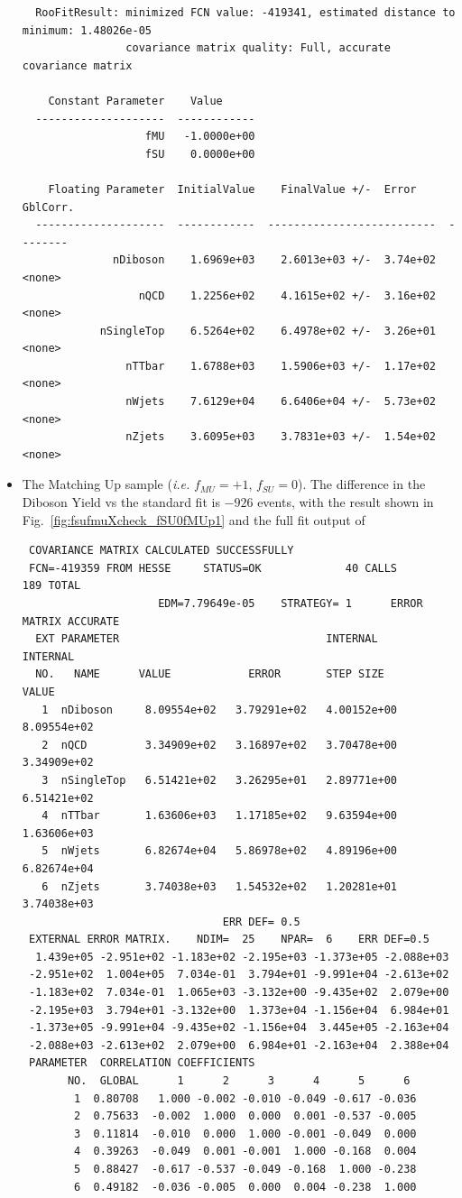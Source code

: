 \begin{itemize}
{\begin{verbatim}
  RooFitResult: minimized FCN value: -419341, estimated distance to minimum: 1.48026e-05
                covariance matrix quality: Full, accurate covariance matrix

    Constant Parameter    Value     
  --------------------  ------------
                   fMU   -1.0000e+00
                   fSU    0.0000e+00

    Floating Parameter  InitialValue    FinalValue +/-  Error     GblCorr.
  --------------------  ------------  --------------------------  --------
              nDiboson    1.6969e+03    2.6013e+03 +/-  3.74e+02  <none>
                  nQCD    1.2256e+02    4.1615e+02 +/-  3.16e+02  <none>
            nSingleTop    6.5264e+02    6.4978e+02 +/-  3.26e+01  <none>
                nTTbar    1.6788e+03    1.5906e+03 +/-  1.17e+02  <none>
                nWjets    7.6129e+04    6.6406e+04 +/-  5.73e+02  <none>
                nZjets    3.6095e+03    3.7831e+03 +/-  1.54e+02  <none>

\end{verbatim}
}


\item The Matching Up sample (\textit{i.e.} $f_{MU}=+1$, $f_{SU}=0$). The difference in the Diboson Yield vs the standard fit is $-926$ events, with the result shown in Fig.~\ref{fig:fsufmuXcheck_fSU0fMUp1} and the full fit output of
{\tiny
\begin{verbatim}
 COVARIANCE MATRIX CALCULATED SUCCESSFULLY
 FCN=-419359 FROM HESSE     STATUS=OK             40 CALLS         189 TOTAL
                     EDM=7.79649e-05    STRATEGY= 1      ERROR MATRIX ACCURATE 
  EXT PARAMETER                                INTERNAL      INTERNAL  
  NO.   NAME      VALUE            ERROR       STEP SIZE       VALUE   
   1  nDiboson     8.09554e+02   3.79291e+02   4.00152e+00   8.09554e+02
   2  nQCD         3.34909e+02   3.16897e+02   3.70478e+00   3.34909e+02
   3  nSingleTop   6.51421e+02   3.26295e+01   2.89771e+00   6.51421e+02
   4  nTTbar       1.63606e+03   1.17185e+02   9.63594e+00   1.63606e+03
   5  nWjets       6.82674e+04   5.86978e+02   4.89196e+00   6.82674e+04
   6  nZjets       3.74038e+03   1.54532e+02   1.20281e+01   3.74038e+03
                               ERR DEF= 0.5
 EXTERNAL ERROR MATRIX.    NDIM=  25    NPAR=  6    ERR DEF=0.5
  1.439e+05 -2.951e+02 -1.183e+02 -2.195e+03 -1.373e+05 -2.088e+03 
 -2.951e+02  1.004e+05  7.034e-01  3.794e+01 -9.991e+04 -2.613e+02 
 -1.183e+02  7.034e-01  1.065e+03 -3.132e+00 -9.435e+02  2.079e+00 
 -2.195e+03  3.794e+01 -3.132e+00  1.373e+04 -1.156e+04  6.984e+01 
 -1.373e+05 -9.991e+04 -9.435e+02 -1.156e+04  3.445e+05 -2.163e+04 
 -2.088e+03 -2.613e+02  2.079e+00  6.984e+01 -2.163e+04  2.388e+04 
 PARAMETER  CORRELATION COEFFICIENTS  
       NO.  GLOBAL      1      2      3      4      5      6
        1  0.80708   1.000 -0.002 -0.010 -0.049 -0.617 -0.036
        2  0.75633  -0.002  1.000  0.000  0.001 -0.537 -0.005
        3  0.11814  -0.010  0.000  1.000 -0.001 -0.049  0.000
        4  0.39263  -0.049  0.001 -0.001  1.000 -0.168  0.004
        5  0.88427  -0.617 -0.537 -0.049 -0.168  1.000 -0.238
        6  0.49182  -0.036 -0.005  0.000  0.004 -0.238  1.000


\end{verbatim}}
\end{itemize}

